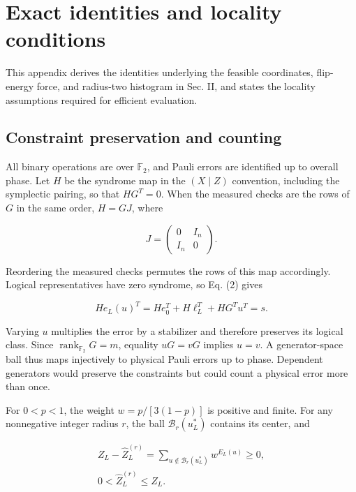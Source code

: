 \documentclass[aps,prapplied,reprint,superscriptaddress,amsmath,amssymb,floatfix,nofootinbib]{revtex4-2}
\begin{document}
\appendix
\renewcommand{\thesubsection}{\thesection.\arabic{subsection}}
\section{ Exact identities and locality
conditions}\label{appendix-a.-exact-identities-and-locality-conditions}

This appendix derives the identities underlying the feasible
coordinates, flip-energy force, and radius-two histogram in Sec. II, and
states the locality assumptions required for efficient evaluation.

\subsection{Constraint preservation and
counting}\label{a.1.-constraint-preservation-and-counting}

All binary operations are over \(\mathbb F_2\), and Pauli errors are
identified up to overall phase. Let \(H\) be the syndrome map in the
\((X\mid Z)\) convention, including the symplectic pairing, so that
\(HG^T=0\). When the measured checks are the rows of \(G\) in the same
order, \(H=GJ\), where

\[
J=\begin{pmatrix}0&I_n\\I_n&0\end{pmatrix}.
\]

Reordering the measured checks permutes the rows of this map
accordingly. Logical representatives have zero syndrome, so Eq. (2)
gives

\[
He_L(u)^T=He_0^T+H\ell_L^T+HG^Tu^T=s.
\]

Varying \(u\) multiplies the error by a stabilizer and therefore
preserves its logical class. Since
\(\operatorname{rank}_{\mathbb F_2}G=m\), equality \(uG=vG\) implies
\(u=v\). A generator-space ball thus maps injectively to physical Pauli
errors up to phase. Dependent generators would preserve the constraints
but could count a physical error more than once.

For \(0<p<1\), the weight \(w=p/[3(1-p)]\) is positive and finite. For
any nonnegative integer radius \(r\), the ball \(\mathcal B_r(u_L^*)\)
contains its center, and

\[
\begin{gathered}
Z_L-\widehat Z_L^{(r)}
=\sum_{u\notin\mathcal B_r(u_L^*)}w^{E_L(u)}\ge0,
\\ 0<\widehat Z_L^{(r)}\le Z_L.
\end{gathered}
\]
\end{document}
